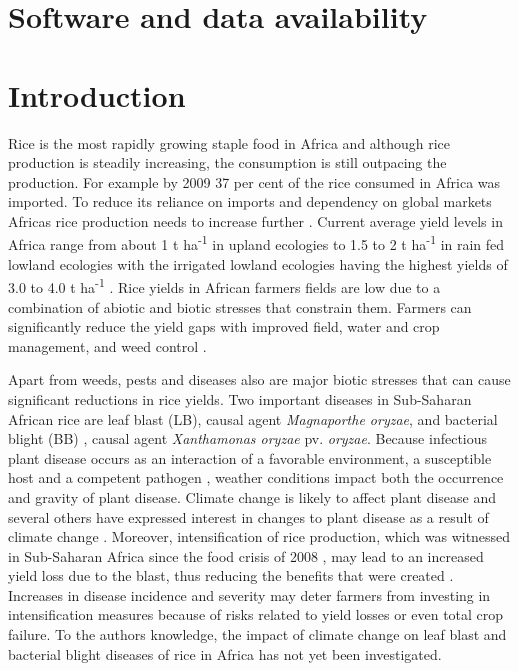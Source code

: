 \documentclass[preprint,12pt]{elsarticle}
\begin{document}
\section{Software and data availability}


\section{Introduction}
Rice is the most rapidly growing staple food in Africa and although rice production is steadily increasing, the consumption is still outpacing the production. For example by 2009 37 per cent of the rice consumed in Africa was imported. To reduce its reliance on imports and dependency on global markets Africas rice production needs to increase further \cite{Seck2013}. Current average yield levels in Africa range from about 1 t ha\textsuperscript{-1} in upland ecologies to 1.5 to 2 t ha\textsuperscript{-1} in rain fed lowland ecologies with the irrigated lowland ecologies having the highest yields of 3.0 to 4.0 t ha\textsuperscript{-1} \cite{Diagne2013}. Rice yields in African farmers fields are low due to a combination of abiotic and biotic stresses that constrain them. Farmers can significantly reduce the yield gaps with improved field, water and crop management, and weed control \cite{Saito2013}.

Apart from weeds, pests and diseases also are major biotic stresses that can cause significant reductions in rice yields. Two important diseases in Sub-Saharan African rice are leaf blast (LB), causal agent \textit{Magnaporthe oryzae}, and bacterial blight (BB) \cite{Verdier2012}, causal agent \textit{Xanthamonas oryzae} pv. \textit{oryzae}. Because infectious plant disease occurs as an interaction of a favorable environment, a susceptible host and a competent pathogen \cite{Madden2007}, weather conditions impact both the occurrence and gravity of plant disease. Climate change is likely to affect plant disease \cite{Anderson2004, Coakley1999, Garrett2006} and several others have expressed interest in changes to plant disease as a result of climate change \cite{Chakraborty2011, Juroszek2011, Luck2011, Pautasso2010, Savary2011, Sutherst2011}. Moreover, intensification of rice production, which was witnessed in Sub-Saharan Africa since the food crisis of 2008 \cite{Saito2013}, may lead to an increased yield loss due to the blast, thus reducing the benefits that were created \cite{Sere2013}. Increases in disease incidence and severity may deter farmers from investing in intensification measures because of risks related to yield losses or even total crop failure. To the authors knowledge, the impact of climate change on leaf blast and bacterial blight diseases of rice in Africa has not yet been investigated.
\end{document}
